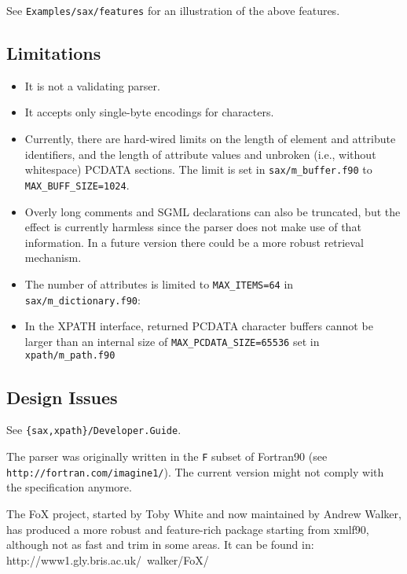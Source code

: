 \documentclass[11pt]{article}
\begin{document}
See \texttt{Examples/sax/features} for an illustration of the above
features.

\subsection{Limitations}
\begin{itemize}

\item It is not a validating parser.

\item It accepts only single-byte encodings for characters. 

\item Currently, there are hard-wired limits on the length of element
  and attribute identifiers, and the length of attribute values and
  unbroken (i.e., without whitespace) PCDATA sections.  The limit is
  set in \texttt{sax/m\_buffer.f90} to \texttt{MAX\_BUFF\_SIZE=1024}.

\item Overly long comments and SGML declarations can also be
truncated, but the effect is currently harmless since the parser does
not make use of that information. In a future version there could be a
more robust retrieval mechanism.

\item  The number of attributes is limited to \texttt{MAX\_ITEMS=64}
  in \texttt{sax/m\_dictionary.f90}: 

 
 \item In the XPATH interface, returned PCDATA character buffers
 cannot be larger than an internal size of
 \texttt{MAX\_PCDATA\_SIZE=65536} set in \texttt{xpath/m\_path.f90}


\end{itemize}

\subsection{Design Issues}

See \texttt{\{sax,xpath\}/Developer.Guide}.

The parser was originally written in the \texttt{F} subset of
Fortran90 (see \texttt{http://fortran.com/imagine1/}). The current
version might not comply with the specification anymore.
 
The FoX project, started by Toby White and now maintained by
Andrew Walker, has produced a more robust and feature-rich package
starting from xmlf90, although not as fast and trim in some areas.  It
can be found in: http://www1.gly.bris.ac.uk/~walker/FoX/
\end{document}
